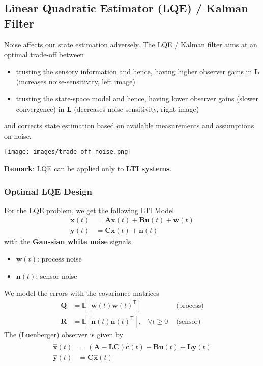 \subsection{Linear Quadratic Estimator (LQE) / Kalman Filter}\label{obs::LQE}

Noise affects our state estimation adversely. The LQE / Kalman filter aims at an optimal trade-off between
\begin{itemize}
    \item trusting the sensory information and hence, having higher observer gains in $\mathbf{L}$ (increases noise-sensitivity, left image)
    \item trusting the state-space model and hence, having lower observer gains (slower convergence) in $\mathbf{L}$ (decreases noise-sensitivity, right image)
\end{itemize}
and corrects state estimation based on available measurements and assumptions on noise.
\begin{center}
    \texttt{[image: images/trade\_off\_noise.png]}
\end{center}

\textbf{Remark}: LQE can be applied only to \textbf{LTI systems}.\

\subsubsection{Optimal LQE Design}
For the LQE problem, we get the following LTI Model
\begin{align*}
    \dot{\mathbf{x}}(t) & = \mathbf{Ax}(t)+\mathbf{Bu}(t)+\mathbf{w}(t) \\
    \mathbf{y}(t)       & = \mathbf{Cx}(t)+\mathbf{n}(t)
\end{align*}
with the \textbf{Gaussian white noise} signals
\begin{itemize}
    \item $\mathbf{w}(t)$: process noise
    \item $\mathbf{n}(t)$: sensor noise
\end{itemize}
We model the errors with the covariance matrices
\begin{align*}
    \mathbf{Q} & =\mathbb{E}[\mathbf{w}(t){\mathbf{w}(t)}^{\mathsf{T}}]  &                & \text{ (process)} \\
    \mathbf{R} & =\mathbb{E}[\mathbf{n}(t){\mathbf{n}(t)}^{\mathsf{T}}], & \forall t\geq0 & \text{ (sensor)}
\end{align*}
The (Luenberger) observer is given by
\begin{align*}
    \dot{\hat{\textbf{x}}}(t) & =(\mathbf{A}-\mathbf{LC})\hat{\mathbf{c}}(t)+\mathbf{Bu}(t)+\mathbf{Ly}(t) \\
    \hat{\mathbf{y}}(t)       & =\mathbf{C}\hat{\mathbf{x}}(t)
\end{align*}

